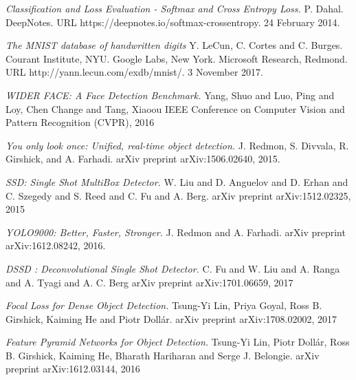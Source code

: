\documentclass[a4paper, twoside]{article}
\begin{document}
\begin{thebibliography}{99}
	
	\textit{Classification and Loss Evaluation - Softmax and Cross Entropy Loss.}
	P. Dahal. 
	DeepNotes.
    URL https://deepnotes.io/softmax-crossentropy.
	24 February 2014.
	
	\textit{The MNIST database of handwritten digits}
	Y. LeCun, C. Cortes and C. Burges. Courant Institute, NYU. Google Labs, New York. Microsoft Research, Redmond. 
	URL http://yann.lecun.com/exdb/mnist/.
	3 November 2017.
	
	
	
    
	\textit{WIDER FACE: A Face Detection Benchmark.}
	Yang, Shuo and Luo, Ping and Loy, Chen Change and Tang, Xiaoou
    IEEE Conference on Computer Vision and Pattern Recognition (CVPR), 2016
    
    
    
    

    
	\textit{You only look once: Unified, real-time object detection.}
    J. Redmon, S. Divvala, R. Girshick, and A. Farhadi. 
    arXiv preprint arXiv:1506.02640, 2015.
    
    
    
	\textit{{SSD:} Single Shot MultiBox Detector.}
	W. Liu and
               D. Anguelov and
               D. Erhan and
               C. Szegedy and
               S. Reed and
               C. Fu and
               A. Berg.
    arXiv preprint arXiv:1512.02325, 2015


    
	\textit{{YOLO9000:} Better, Faster, Stronger.}
    J. Redmon and
               A. Farhadi. 
    arXiv preprint arXiv:1612.08242, 2016.
    
    
    
    
    
	\textit{{DSSD} : Deconvolutional Single Shot Detector.}
	C. Fu and
               W. Liu and
               A. Ranga and
               A. Tyagi and
               A. C. Berg
    arXiv preprint arXiv:1701.06659, 2017
    
    
    
	\textit{Focal Loss for Dense Object Detection.}
	Tsung{-}Yi Lin,
    Priya Goyal,
    Ross B. Girshick,
    Kaiming He and
    Piotr Doll{\'{a}}r.
    arXiv preprint arXiv:1708.02002, 2017

	\textit{Feature Pyramid Networks for Object Detection.}
	Tsung{-}Yi Lin,
               Piotr Doll{\'{a}}r,
               Ross B. Girshick,
               Kaiming He,
               Bharath Hariharan and
               Serge J. Belongie.
    arXiv preprint arXiv:1612.03144, 2016
    


\end{thebibliography}
\end{document}
